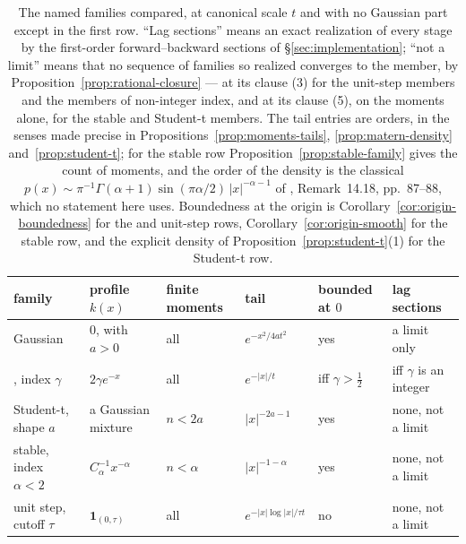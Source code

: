 \begin{table}[!htb]
\centering
\caption{The named families compared, at canonical scale $t$ and with no Gaussian part
except in the first row. ``Lag sections'' means an exact realization of every stage by the
first-order forward--backward sections of \S\ref{sec:implementation}; ``not a limit'' means
that no sequence of families so realized converges to the member, by
Proposition~\ref{prop:rational-closure} --- at its clause (3) for the unit-step members and the
\Matern{} members of non-integer index, and at its clause (5), on the moments alone, for the
stable and Student-t members. The tail entries are orders, in the senses made precise in
Propositions~\ref{prop:moments-tails}, \ref{prop:matern-density} and~\ref{prop:student-t}; for
the stable row Proposition~\ref{prop:stable-family} gives the count of moments, and the order
of the density is the classical
$p(x) \sim \pi^{-1}\Gamma(\alpha+1)\sin(\pi\alpha/2)\,|x|^{-\alpha-1}$ of
, Remark~14.18, pp.~87--88, which no statement here uses. Boundedness at the origin is
Corollary~\ref{cor:origin-boundedness} for the \Matern{} and unit-step rows,
Corollary~\ref{cor:origin-smooth} for the stable row, and the explicit density of
Proposition~\ref{prop:student-t}(1) for the Student-t row.}
\label{tab:families}
\footnotesize
\setlength{\tabcolsep}{4pt}
\begin{tabular}{@{}llllll@{}}
\toprule
family & profile $k(x)$ & finite moments & tail & bounded at $0$ & lag sections \\
\midrule
Gaussian & $0$, with $a > 0$ & all & $e^{-x^2/4at^2}$ & yes & a limit only \\
\Matern{}, index $\gamma$ & $2\gamma e^{-x}$ & all & $e^{-|x|/t}$ & iff $\gamma > \tfrac12$ & iff $\gamma$ is an integer \\
Student-t, shape $a$ & a Gaussian mixture & $n < 2a$ & $|x|^{-2a-1}$ & yes & none, not a limit \\
stable, index $\alpha < 2$ & $C_\alpha^{-1}x^{-\alpha}$ & $n < \alpha$ & $|x|^{-1-\alpha}$ & yes & none, not a limit \\
unit step, cutoff $\tau$ & $\mathbf 1_{(0,\tau)}$ & all & $e^{-|x|\log|x|/\tau t}$ & no & none, not a limit \\
\bottomrule
\end{tabular}
\end{table}


